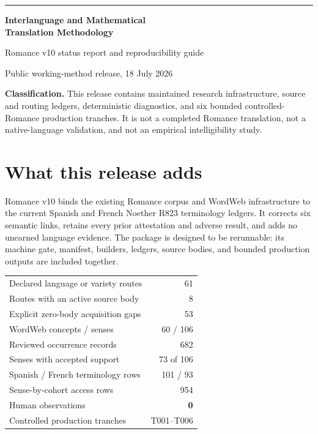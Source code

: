 \documentclass[10pt,a4paper]{article}
\begin{document}
{\color{accent}\rule{\textwidth}{1.2pt}}
\vspace{5mm}

{\Huge\bfseries\color{ink} Interlanguage and Mathematical\\Translation Methodology}

\vspace{2mm}
{\Large Romance v10 status report and reproducibility guide}

\vspace{5mm}
{\small Public working-method release, 18 July 2026}

\vspace{8mm}
\colorbox{soft}{\parbox{0.94\textwidth}{
\textbf{Classification.} This release contains maintained research infrastructure,
source and routing ledgers, deterministic diagnostics, and six bounded controlled-
Romance production tranches. It is not a completed Romance translation, not a
native-language validation, and not an empirical intelligibility study.
}}

\section*{What this release adds}

Romance v10 binds the existing Romance corpus and WordWeb infrastructure to the
current Spanish and French Noether R823 terminology ledgers. It corrects six
semantic links, retains every prior attestation and adverse result, and adds no
unearned language evidence. The package is designed to be rerunnable: its
machine gate, manifest, builders, ledgers, source bodies, and bounded production
outputs are included together.

\begin{center}
\begin{tabular}{@{}lr@{}}
\toprule
Declared language or variety routes & 61 \\
Routes with an active source body & 8 \\
Explicit zero-body acquisition gaps & 53 \\
WordWeb concepts / senses & 60 / 106 \\
Reviewed occurrence records & 682 \\
Senses with accepted support & 73 of 106 \\
Spanish / French terminology rows & 101 / 93 \\
Sense-by-cohort access rows & 954 \\
Human observations & \textbf{0} \\
Controlled production tranches & T001--T006 \\
\bottomrule
\end{tabular}
\end{center}
\end{document}
